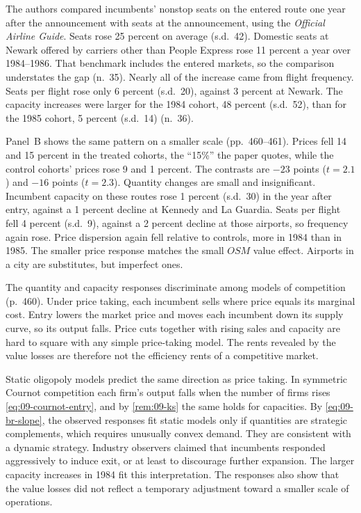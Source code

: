 The authors compared incumbents' nonstop seats on the entered route one year after the announcement
with seats at the announcement, using the \emph{Official Airline Guide}. Seats rose 25 percent on
average (s.d.\ 42). Domestic seats at Newark offered by carriers other than People Express rose 11
percent a year over 1984--1986. That benchmark includes the entered markets, so the comparison
understates the gap (n.~35). Nearly all of the increase came from flight frequency. Seats per
flight rose only 6 percent (s.d.\ 20), against 3 percent at Newark. The capacity increases were larger
for the 1984 cohort, 48 percent (s.d.\ 52), than for the 1985 cohort, 5 percent (s.d.\ 14)
(n.~36).

Panel~B shows the same pattern on a smaller scale (pp.~460--461). Prices fell 14 and 15 percent
in the treated cohorts, the ``15\%'' the paper quotes, while the control cohorts' prices rose 9 and 1
percent. The contrasts are $-23$ points ($t=2.1$) and $-16$ points ($t=2.3$). Quantity changes are
small and insignificant. Incumbent capacity on these routes rose 1 percent (s.d.\ 30) in the year
after entry, against a 1 percent decline at Kennedy and La Guardia. Seats per flight fell 4 percent
(s.d.\ 9), against a 2 percent decline at those airports, so frequency again rose. Price dispersion
again fell relative to controls, more in 1984 than in 1985. The smaller price response matches the
small $\mathit{OSM}$ value effect. Airports in a city are substitutes, but imperfect ones.

The quantity and capacity responses discriminate among models of competition (p.~460). Under
price taking, each incumbent sells where price equals its marginal cost. Entry lowers the market price
and moves each incumbent down its supply curve, so its output falls. Price cuts together with rising
sales and capacity are hard to square with any simple price-taking model. The rents revealed by the
value losses are therefore not the efficiency rents of a competitive market.

Static oligopoly models predict the same direction as price taking. In symmetric Cournot competition
each firm's output falls when the number of firms rises \eqref{eq:09-cournot-entry}, and by
\cref{rem:09-ks} the same holds for capacities. By \eqref{eq:09-br-slope}, the observed responses fit
static models only if quantities are strategic complements, which requires unusually convex demand.
They are consistent with a dynamic strategy. Industry observers
claimed that incumbents responded aggressively to induce exit, or at least to discourage further
expansion. The larger capacity increases in 1984 fit this interpretation. The responses also show that
the value losses did not reflect a temporary adjustment toward a smaller scale of operations.

